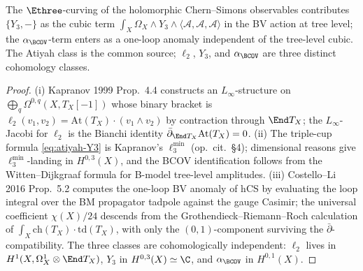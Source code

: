 \begin{theorem}
\begin{enumerate}[label=(\roman*)]
\end{enumerate}
The $\Ethree$-curving of the holomorphic Chern--Simons observables contributes $\{Y_3, -\}$ as the cubic term $\int_X \Omega_X \wedge Y_3 \wedge \langle \mathcal A, \mathcal A, \mathcal A\rangle$ in the BV action at tree level; the $\alpha_{\BCOV}$-term enters as a one-loop anomaly independent of the tree-level cubic. The Atiyah class is the common source; $\ell_2$, $Y_3$, and $\alpha_{\BCOV}$ are three distinct cohomology classes.
\end{theorem}

\begin{proof}
(i) Kapranov 1999 Prop.~4.4 constructs an $L_\infty$-structure on $\bigoplus_q \Omega^{0,q}(X, T_X[-1])$ whose binary bracket is $\ell_2(v_1, v_2) = \mathrm{At}(T_X) \cdot (v_1 \wedge v_2)$ by contraction through $\End T_X$; the $L_\infty$-Jacobi for $\ell_2$ is the Bianchi identity $\bar\partial_{\End T_X} \mathrm{At}(T_X) = 0$. (ii) The triple-cup formula \eqref{eq:atiyah-Y3} is Kapranov's $\ell_3^{\min}$ (op.\ cit.\ \S4); dimensional reasons give $\ell_3^{\min}$-landing in $H^{0,3}(X)$, and the BCOV identification follows from the Witten--Dijkgraaf formula for B-model tree-level amplitudes. (iii) Costello--Li 2016 Prop.~5.2 computes the one-loop BV anomaly of hCS by evaluating the loop integral over the BM propagator tadpole against the gauge Casimir; the universal coefficient $\chi(X)/24$ descends from the Grothendieck--Riemann--Roch calculation of $\int_X \mathrm{ch}(T_X) \cdot \mathrm{td}(T_X)$, with only the $(0,1)$-component surviving the $\bar\partial$-compatibility. The three classes are cohomologically independent: $\ell_2$ lives in $H^1(X, \Omega^1_X \otimes \End T_X)$, $Y_3$ in $H^{0,3}(X) \simeq \C$, and $\alpha_{\BCOV}$ in $H^{0,1}(X)$.
\end{proof}

